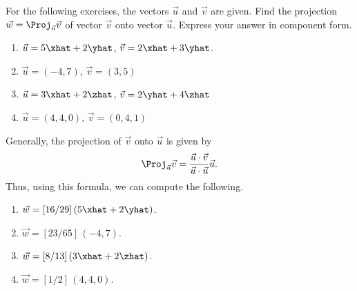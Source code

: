 \begin{exercises}
\begin{problist}
        \prob[\openstax]	For the following exercises, the vectors $\vec{u}$ and $\vec{v}$ are given.
        Find the projection $\vec{w} = \Proj_{\vec{u}}\vec{v}$ of vector $\vec{v}$ onto vector
        $\vec{u}$. Express your answer in component form.
			\begin{enumerate}
				\item	$\vec{u} = 5\xhat + 2\yhat$, $\vec{v} = 2\xhat + 3\yhat$.
				\item	$\vec{u} = (−4, 7)$, $\vec{v} = (3, 5)$
				\item	$\vec{u} = 3\xhat + 2\zhat$, $\vec{v} = 2\yhat + 4\zhat$
				\item	$\vec{u} = (4, 4, 0)$, $\vec{v} = (0, 4, 1)$
			\end{enumerate}
            \begin{solution}
                Generally, the projection of $\vec{v}$ onto $\vec{u}$ is given by
                \[ 
                    \Proj_{\vec{u}}\vec{v} = \frac{\vec{u} \cdot \vec{v}}{\vec{u} \cdot \vec{u}}
                    \vec{u}.
                \]
                Thus, using this formula, we can compute the following.
                \begin{enumerate}
                    \item   $\vec{w} = [16/29] \, (5\xhat + 2\yhat)$.
                    \item   $\vec{w} = [23/65] \, (-4,7)$.
                    \item   $\vec{w} = [8/13] \, (3\xhat + 2\zhat)$.
                    \item   $\vec{w} = [1/2] \, (4,4,0)$.
                \end{enumerate}
            \end{solution}


\end{problist}
\end{exercises}
